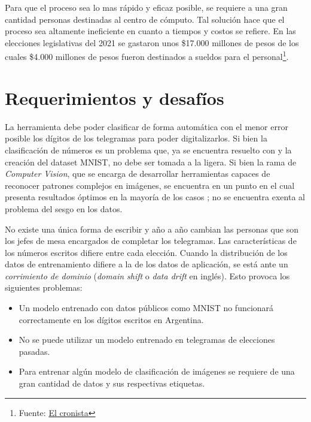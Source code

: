 \documentclass[a4paper, twoside, spanish]{report}
\begin{document}
Para que el proceso sea lo mas r\'apido y eficaz posible, se requiere a una gran cantidad personas destinadas al centro
de c\'omputo. Tal soluci\'on hace que el proceso sea altamente ineficiente en cuanto a tiempos y costos se refiere. En
las elecciones legislativas del 2021 se gastaron unos \$17.000 millones de pesos de los cuales \$4.000 millones de
pesos fueron destinados a sueldos para el personal\footnote{Fuente:
	\href{https://www.cronista.com/economia-politica/Elecciones-legislativas-2021-cuanto-mas-se-gastara-por-el-coronavirus-segun-el-Presupuesto-20201004-0006.html}{El
		cronista}}.

\section*{Requerimientos y desafíos}

La herramienta debe poder clasificar de forma autom\'atica con el menor error posible los d\'igitos de los telegramas
para poder digitalizarlos. Si bien la clasificaci\'on de n\'umeros es un problema que, ya se encuentra resuelto con
\parencite{lecun1998gradient} y la creaci\'on del dataset MNIST, no debe ser tomada a la ligera. Si bien la rama de {\it
		Computer Vision}, que se encarga de desarrollar herramientas capaces de reconocer patrones complejos en im\'agenes, se
encuentra en un punto en el cual presenta resultados \'optimos en la mayor\'ia de los casos \parencite{szeliski2010computer, redmon2016yolo}; no se encuentra exenta al problema del sesgo en los datos.

No existe una \'unica forma de escribir y a\~{n}o a a\~{n}o cambian las personas que son los jefes de mesa encargados
de completar los telegramas. Las caracter\'isticas de los n\'umeros escritos difiere entre cada elecci\'on. Cuando la
distribuci\'on de los datos de entrenamiento difiere a la de los datos de aplicaci\'on, se est\'a ante un {\it
		corrimiento de dominio} ({\it domain shift} o {\it data drift} en ingl\'es). Esto provoca los siguientes problemas:

\begin{itemize}
	\item Un modelo entrenado con datos p\'ublicos como MNIST no funcionar\'a correctamente en los d\'igitos escritos en
	      Argentina.
	\item No se puede utilizar un modelo entrenado en telegramas de elecciones pasadas.
	\item Para entrenar alg\'un modelo de clasificaci\'on de im\'agenes se requiere de una gran cantidad de datos y sus
	      respectivas etiquetas.
\end{itemize}
\end{document}
